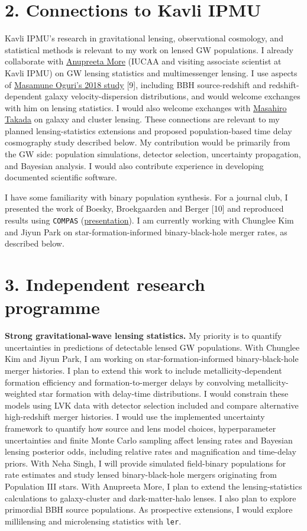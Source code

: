 \documentclass[11pt]{article}
\begin{document}
\section*{2. Connections to Kavli IPMU}
Kavli IPMU's research in gravitational lensing, observational cosmology, and statistical methods is relevant to my work on lensed GW populations. I already collaborate with \href{https://db.ipmu.jp/member/personal/2772en.html}{Anupreeta More} (IUCAA and visiting associate scientist at Kavli IPMU) on GW lensing statistics and multimessenger lensing. I use aspects of \href{https://arxiv.org/abs/1807.02584}{Masamune Oguri's 2018 study} [9], including BBH source-redshift and redshift-dependent galaxy velocity-dispersion distributions, and would welcome exchanges with him on lensing statistics. I would also welcome exchanges with \href{https://db.ipmu.jp/member/personal/698en.html}{Masahiro Takada} on galaxy and cluster lensing. These connections are relevant to my planned lensing-statistics extensions and proposed population-based time delay cosmography study described below. My contribution would be primarily from the GW side: population simulations, detector selection, uncertainty propagation, and Bayesian analysis. I would also contribute experience in developing documented scientific software.

I have some familiarity with binary population synthesis. For a journal club, I presented the work of Boesky, Broekgaarden and Berger [10] and reproduced results using \texttt{COMPAS} (\href{https://docs.google.com/presentation/d/1WBn-nu949xdn9oGZe1GgIlbHsQ_ZBelahJA6aSFyVq0/edit}{presentation}). I am currently working with Chunglee Kim and Jiyun Park on star-formation-informed binary-black-hole merger rates, as described below.

\section*{3. Independent research programme}
\textbf{Strong gravitational-wave lensing statistics.} My priority is to quantify uncertainties in predictions of detectable lensed GW populations. With Chunglee Kim and Jiyun Park, I am working on star-formation-informed binary-black-hole merger histories. I plan to extend this work to include metallicity-dependent formation efficiency and formation-to-merger delays by convolving metallicity-weighted star formation with delay-time distributions. I would constrain these models using LVK data with detector selection included and compare alternative high-redshift merger histories. I would use the implemented uncertainty framework to quantify how source and lens model choices, hyperparameter uncertainties and finite Monte Carlo sampling affect lensing rates and Bayesian lensing posterior odds, including relative rates and magnification and time-delay priors. With Neha Singh, I will provide simulated field-binary populations for rate estimates and study lensed binary-black-hole mergers originating from Population III stars. With Anupreeta More, I plan to extend the lensing-statistics calculations to galaxy-cluster and dark-matter-halo lenses. I also plan to explore primordial BBH source populations. As prospective extensions, I would explore millilensing and microlensing statistics with \texttt{ler}.
\end{document}
